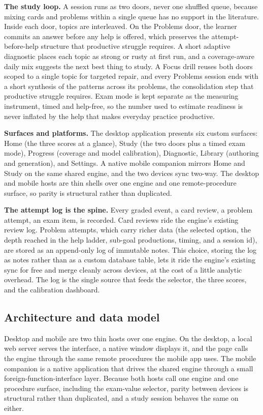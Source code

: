 \documentclass[11pt]{article}
\begin{document}
\textbf{The study loop.} A session runs as two doors, never one shuffled queue,
because mixing cards and problems within a single queue has no support in the
literature. Inside each door, topics are interleaved. On the Problems door, the
learner commits an answer before any help is offered, which preserves the
attempt-before-help structure that productive struggle requires. A short adaptive
diagnostic places each topic as strong or rusty at first run, and a coverage-aware
daily mix suggests the next best thing to study. A Focus drill reuses both doors scoped
to a single topic for targeted repair, and every Problems session ends with a short
synthesis of the patterns across its problems, the consolidation step that productive
struggle requires. Exam mode is kept separate as the measuring instrument, timed and
help-free, so the number used to estimate readiness is never inflated by the help that
makes everyday practice productive.

\textbf{Surfaces and platforms.} The desktop application presents six custom
surfaces: Home (the three scores at a glance), Study (the two doors plus a timed exam
mode), Progress (coverage and model calibration), Diagnostic, Library (authoring and
generation), and Settings. A native mobile companion mirrors Home and Study on the
same shared engine, and the two devices sync two-way. The desktop and mobile hosts
are thin shells over one engine and one remote-procedure surface, so parity is
structural rather than duplicated.

\textbf{The attempt log is the spine.} Every graded event, a card review, a problem
attempt, an exam item, is recorded. Card reviews ride the engine's existing review
log. Problem attempts, which carry richer data (the selected option, the depth
reached in the help ladder, sub-goal productions, timing, and a session id), are
stored as an append-only log of immutable notes. This choice, storing the log as
notes rather than as a custom database table, lets it ride the engine's existing
sync for free and merge cleanly across devices, at the cost of a little analytic
overhead. The log is the single source that feeds the selector, the three scores, and
the calibration dashboard.

\subsection{Architecture and data model}

Desktop and mobile are two thin hosts over one engine. On the desktop, a local web
server serves the interface, a native window displays it, and the page calls the
engine through the same remote procedures the mobile app uses. The mobile companion is
a native application that drives the shared engine through a small
foreign-function-interface layer. Because both hosts call one engine and one procedure
surface, including the exam-value selector, parity between devices is structural rather
than duplicated, and a study session behaves the same on either.
\end{document}
